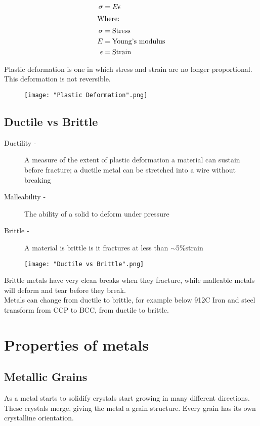\documentclass[a4paper, 12pt]{article}
\begin{document}
			\begin{align*}
				\sigma &= E \epsilon \\			
				\intertext{Where:} 			
			 	\sigma &= \text{Stress} \\
				E &= \text{Young's modulus} \\
				\epsilon &= \text{Strain} \\
			\end{align*}
			
			Plastic deformation is one in which stress and strain are no longer proportional. This deformation is not reversible.
			
			\begin{figure}[!h]
				\texttt{[image: "Plastic Deformation".png]}
			\end{figure}
			
		\subsection*{Ductile vs Brittle}
			\begin{description}
				\item[Ductility - ] A measure of the extent of plastic deformation a material can sustain before fracture; a ductile metal can be stretched into a wire without breaking
				\item[Malleability - ] The ability of a solid to deform under pressure
				\item[Brittle - ] A material is brittle is it fractures at less than $\sim$5\%strain
			\end{description}
			

			\begin{figure}
				\texttt{[image: "Ductile vs Brittle".png]}
			\end{figure}

			Brittle metals have very clean breaks when they fracture, while malleable metals will deform and tear before they break. \\
			Metals can change from ductile to brittle, for example below 912\degree C Iron and steel transform from CCP to BCC, from ductile to brittle. \\
		
	\pagebreak
	
	\section{Properties of metals}
		\subsection*{Metallic Grains}
			As a metal starts to solidify crystals start growing in many different directions. These crystals merge, giving the metal a grain structure. Every grain has its own crystalline orientation.
			
\end{document}
